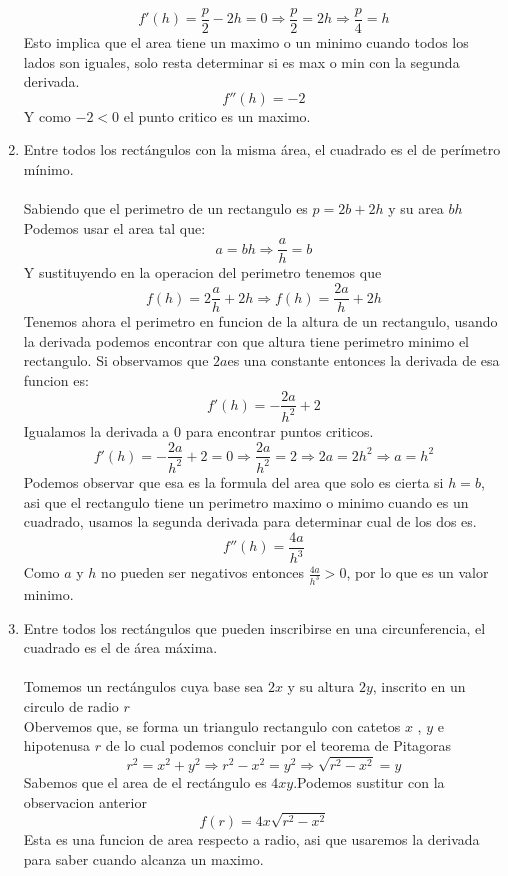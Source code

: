 \documentclass[12pt]{article}
\begin{document}
\begin{enumerate}[\hspace{9px} a)]
    \[f'(h)=\displaystyle\frac{p}{2}-2h=0\Rightarrow \displaystyle\frac{p}{2}=2h\Rightarrow \displaystyle\frac{p}{4}=h\]
    Esto implica que el area tiene un maximo o un minimo cuando todos los lados son iguales, solo resta determinar si es max o min con la segunda derivada.
    \[f''(h)=-2\]
    Y como \(-2<0\) el punto critico es un maximo. 
    \item Entre todos los rect\'angulos con la misma \'area, el cuadrado es el de per\'imetro m\'inimo.\\ \\
    Sabiendo que el perimetro de un rectangulo es \(p=2b+2h\) y su area \(bh\)
    Podemos usar el area tal que: \[a=bh\Rightarrow \displaystyle\frac{a}{h}=b\]
    Y sustituyendo en la operacion del perimetro tenemos que \[f(h)=2\displaystyle\frac{a}{h}+2h\Rightarrow f(h)=\displaystyle\frac{2a}{h}+2h\]
    Tenemos ahora el perimetro en funcion de la altura de un rectangulo, usando la derivada podemos encontrar con que altura tiene perimetro minimo el rectangulo. Si observamos que \(2a\)es una constante entonces la derivada de esa funcion es: 
    \[f'(h)=-\displaystyle\frac{2a}{h^2}+2\]
    Igualamos la derivada a 0 para encontrar puntos criticos.
    \[f'(h)=-\displaystyle\frac{2a}{h^2}+2=0\Rightarrow \displaystyle\frac{2a}{h^2}=2\Rightarrow 2a=2h^2\Rightarrow a=h^2\]
    Podemos observar que esa es la formula del area que solo es cierta si \(h=b\), asi que el rectangulo tiene un perimetro maximo o minimo cuando es un cuadrado, usamos la segunda derivada para determinar cual de los dos es.
    \[f''(h)=\displaystyle\frac{4a}{h^3}\]
    Como \(a\) y \(h\) no pueden ser negativos entonces \(\displaystyle\frac{4a}{h^3}>0\), por lo que es un valor minimo.
    \item Entre todos los rect\'angulos que pueden inscribirse en una circunferencia, el cuadrado es el de \'area m\'axima. \\ \\
    Tomemos un rect\'angulos cuya base sea \(2x\) y su altura \(2y\), inscrito en un circulo de radio \(r\)\\
    Obervemos que, se forma un triangulo rectangulo con catetos \(x\) , \(y\) e hipotenusa \(r\) de lo cual podemos concluir por el teorema de Pitagoras 
    \[r^2=x^2+y^2\Rightarrow r^2-x^2=y^2\Rightarrow \sqrt{r^2-x^2}=y\]
    Sabemos que el area de el rect\'angulo es \(4xy\).\quad Podemos sustitur con la observacion anterior
    \[f(r)=4x\sqrt{r^2-x^2}\]
    Esta es una funcion de area respecto a radio, asi que usaremos la derivada para saber cuando alcanza un maximo.\\

\end{enumerate}
\end{document}
